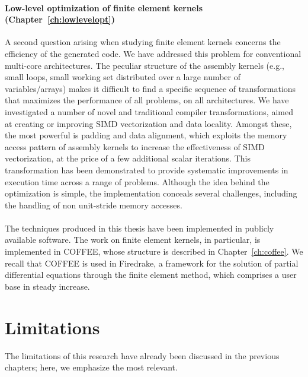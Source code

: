 \paragraph{Low-level optimization of finite element kernels (Chapter~\ref{ch:lowlevelopt})}
A second question arising when studying finite element kernels concerns the efficiency of the generated code. We have addressed this problem for conventional multi-core architectures. The peculiar structure of the assembly kernels (e.g., small loops, small working set distributed over a large number of variables/arrays) makes it difficult to find a specific sequence of transformations that maximizes the performance of all problems, on all architectures. We have investigated a number of novel and traditional compiler transformations, aimed at creating or improving SIMD vectorization and data locality. Amongst these, the most powerful is padding and data alignment, which exploits the memory access pattern of assembly kernels to increase the effectiveness of SIMD vectorization, at the price of a few additional scalar iterations. This transformation has been demonstrated to provide systematic improvements in execution time across a range of problems. Although the idea behind the optimization is simple, the implementation conceals several challenges, including the handling of non unit-stride memory accesses.
~\\ 
~\\
The techniques produced in this thesis have been implemented in publicly available software. The work on finite element kernels, in particular, is implemented in COFFEE, whose structure is described in Chapter~\ref{ch:coffee}. We recall that COFFEE is used in Firedrake, a framework for the solution of partial differential equations through the finite element method, which comprises a user base in steady increase.

\section{Limitations}
The limitations of this research have already been discussed in the previous chapters; here, we emphasize the most relevant.


